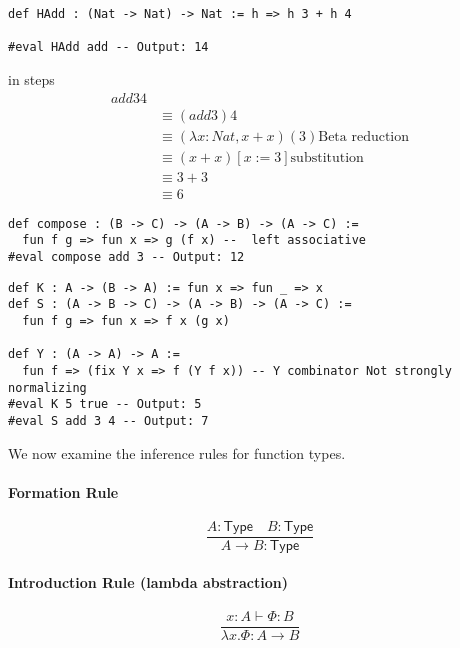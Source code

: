 \begin{example}
  \begin{lstlisting}[language=Lean]
def HAdd : (Nat -> Nat) -> Nat := h => h 3 + h 4

#eval HAdd add -- Output: 14

\end{lstlisting}
  in steps
  \begin{align}
    add 3 4                                                     \\
     & \equiv (add 3) 4                                         \\
     & \equiv (\lambda x : Nat, x + x)(3) \text{Beta reduction} \\
     & \equiv (x + x) [x:= 3] \text{substitution}               \\
     & \equiv 3 + 3                                             \\
     & \equiv 6
  \end{align}
\end{example}
\begin{example}
  \begin{lstlisting}[language=Lean]
def compose : (B -> C) -> (A -> B) -> (A -> C) :=
  fun f g => fun x => g (f x) --  left associative 
#eval compose add 3 -- Output: 12
\end{lstlisting}
\end{example}
\begin{example}
  \begin{lstlisting}[language=Lean]
def K : A -> (B -> A) := fun x => fun _ => x  
def S : (A -> B -> C) -> (A -> B) -> (A -> C) :=
  fun f g => fun x => f x (g x)

def Y : (A -> A) -> A := 
  fun f => (fix Y x => f (Y f x)) -- Y combinator Not strongly normalizing
#eval K 5 true -- Output: 5 
#eval S add 3 4 -- Output: 7
\end{lstlisting}
\end{example}
We now examine the inference rules for function types.
\paragraph{Formation Rule}
\[
  \frac{A : \mathsf{Type} \quad B : \mathsf{Type}}{A \to B : \mathsf{Type}}
\]

\paragraph{Introduction Rule (lambda abstraction)}
\[
  \frac{x : A \vdash \Phi : B}{\lambda x.\Phi : A \to B}
\]

